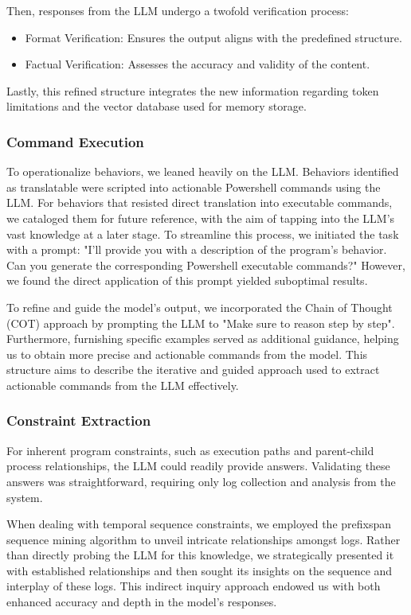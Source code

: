 Then, responses from the LLM undergo a twofold verification process:
\begin{itemize}
\item Format Verification: Ensures the output aligns with the predefined structure.
\item Factual Verification: Assesses the accuracy and validity of the content. 
\end{itemize}
Lastly, this refined structure integrates the new information regarding token limitations and the vector database used for memory storage.


\subsubsection{Command Execution}
To operationalize behaviors, we leaned heavily on the LLM. Behaviors identified as translatable were scripted into actionable Powershell commands using the LLM. For behaviors that resisted direct translation into executable commands, we cataloged them for future reference, with the aim of tapping into the LLM's vast knowledge at a later stage.
To streamline this process, we initiated the task with a prompt: "I'll provide you with a description of the program's behavior. Can you generate the corresponding Powershell executable commands?" However, we found the direct application of this prompt yielded suboptimal results.

To refine and guide the model's output, we incorporated the Chain of Thought (COT) approach by prompting the LLM to "Make sure to reason step by step". Furthermore, furnishing specific examples served as additional guidance, helping us to obtain more precise and actionable commands from the model.
This structure aims to describe the iterative and guided approach used to extract actionable commands from the LLM effectively.

\subsubsection{Constraint Extraction}
For inherent program constraints, such as execution paths and parent-child process relationships, the LLM could readily provide answers. Validating these answers was straightforward, requiring only log collection and analysis from the system.

When dealing with temporal sequence constraints, we employed the prefixspan sequence mining algorithm to unveil intricate relationships amongst logs. Rather than directly probing the LLM for this knowledge, we strategically presented it with established relationships and then sought its insights on the sequence and interplay of these logs. This indirect inquiry approach endowed us with both enhanced accuracy and depth in the model's responses.

